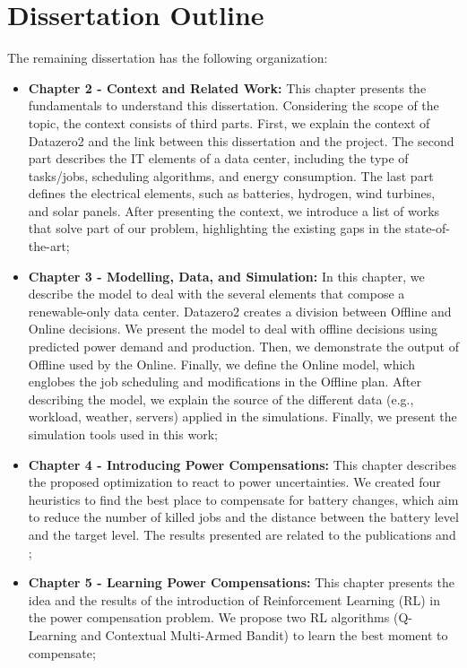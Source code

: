 \section{Dissertation Outline}
The remaining dissertation has the following organization:
\begin{itemize}
    \item[] \textbf{Chapter 2 - Context and Related Work:} This chapter presents the fundamentals to understand this dissertation. Considering the scope of the topic, the context consists of third parts. First, we explain the context of Datazero2 and the link between this dissertation and the project. The second part describes the IT elements of a data center, including the type of tasks/jobs, scheduling algorithms, and energy consumption. The last part defines the electrical elements, such as batteries, hydrogen, wind turbines, and solar panels. After presenting the context, we introduce a list of works that solve part of our problem, highlighting the existing gaps in the state-of-the-art;
    \item[] \textbf{Chapter 3 - Modelling, Data, and Simulation:} In this chapter, we describe the model to deal with the several elements that compose a renewable-only data center. Datazero2 creates a division between Offline and Online decisions. We present the model to deal with offline decisions using predicted power demand and production. Then, we demonstrate the output of Offline used by the Online. Finally, we define the Online model, which englobes the job scheduling and modifications in the Offline plan. After describing the model, we explain the source of the different data (e.g., workload, weather, servers) applied in the simulations. Finally, we present the simulation tools used in this work;
    \item[] \textbf{Chapter 4 - Introducing Power Compensations:} This chapter describes the proposed optimization to react to power uncertainties. We created four heuristics to find the best place to compensate for battery changes, which aim to reduce the number of killed jobs and the distance between the battery level and the target level. The results presented are related to the publications \cite{de2022mixing} and \cite{de2022analyzing};
    \item[] \textbf{Chapter 5 - Learning Power Compensations:} This chapter presents the idea and the results of the introduction of Reinforcement Learning (RL) in the power compensation problem. We propose two RL algorithms (Q-Learning and Contextual Multi-Armed Bandit) to learn the best moment to compensate;

\end{itemize}

